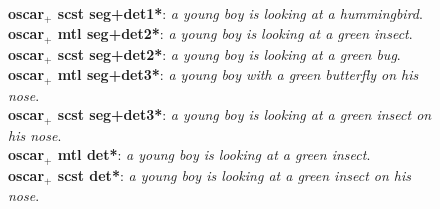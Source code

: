 \begin{figure}[H]
{        \textbf{\acrshort{oscar}$_+$ \acrshort{scst} seg+det1*}: \textit{a young boy is looking at a hummingbird}.\\
        \textbf{\acrshort{oscar}$_+$ \acrshort{mtl} seg+det2*}: \textit{a young boy is looking at a green insect}.\\
        \textbf{\acrshort{oscar}$_+$ \acrshort{scst} seg+det2*}: \textit{a young boy is looking at a green bug}.\\
        \textbf{\acrshort{oscar}$_+$ \acrshort{mtl} seg+det3*}: \textit{a young boy with a green butterfly on his nose}.\\
        \textbf{\acrshort{oscar}$_+$ \acrshort{scst} seg+det3*}: \textit{a young boy is looking at a green insect on his nose}.\\
        \textbf{\acrshort{oscar}$_+$ \acrshort{mtl} det*}: \textit{a young boy is looking at a green insect}.\\
        \textbf{\acrshort{oscar}$_+$ \acrshort{scst} det*}: \textit{a young boy is looking at a green insect on his nose}.
        }
        \label{fig:test4}
\end{figure}

